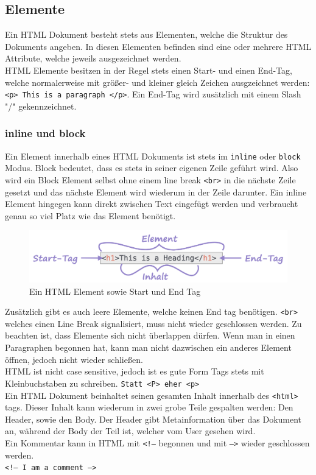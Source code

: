 \documentclass{article}
\begin{document}
	\subsection{Elemente}
	Ein HTML Dokument besteht stets aus Elementen, welche die Struktur des Dokuments angeben. In diesen Elementen befinden sind eine oder mehrere HTML Attribute, welche jeweils ausgezeichnet werden. \\
	HTML Elemente besitzen in der Regel stets einen Start- und einen End-Tag, welche normalerweise mit größer- und kleiner gleich Zeichen ausgzeichnet werden: \texttt{<p> This is a paragraph </p>}. Ein End-Tag wird zusätzlich mit einem Slash "/" gekennzeichnet.
	\subsubsection{inline und block}
	Ein Element innerhalb eines HTML Dokuments ist stets im \texttt{inline} oder \texttt{block} Modus. Block bedeutet, dass es stets in seiner eigenen Zeile geführt wird. Also wird ein Block Element selbst ohne einem line break \texttt{<br>} in die nächste Zeile gesetzt und das nächste Element wird wiederum in der Zeile darunter. Ein inline Element hingegen kann direkt zwischen Text eingefügt werden und verbraucht genau so viel Platz wie das Element benötigt.
	\begin{figure}[H]
	\centering
	\includegraphics[scale=0.4]{Bilder/tag.png}
	\caption{Ein HTML Element sowie Start und End Tag}
	\end{figure}
	Zusätzlich gibt es auch leere Elemente, welche keinen End tag benötigen. \texttt{<br>} welches einen Line Break signalisiert, muss nicht wieder geschlossen werden. Zu beachten ist, dass Elemente sich nicht überlappen dürfen. Wenn man in einen Paragraphen begonnen hat, kann man nicht dazwischen ein anderes Element öffnen, jedoch nicht wieder schließen. \\
	HTML ist nicht case sensitive, jedoch ist es gute Form Tags stets mit Kleinbuchstaben zu schreiben. \texttt{Statt <P> eher <p>}\\
	Ein HTML Dokument beinhaltet seinen gesamten Inhalt innerhalb des \texttt{<html>} tags. Dieser Inhalt kann wiederum in zwei grobe Teile gespalten werden: Den Header, sowie den Body. Der Header gibt Metainformation über das Dokument an, während der Body der Teil ist, welcher vom User gesehen wird. \\
	Ein Kommentar kann in HTML mit \texttt{<!--} begonnen und mit \texttt{-->} wieder geschlossen werden. \\
	\texttt{<!-- I am a comment -->}
\end{document}
